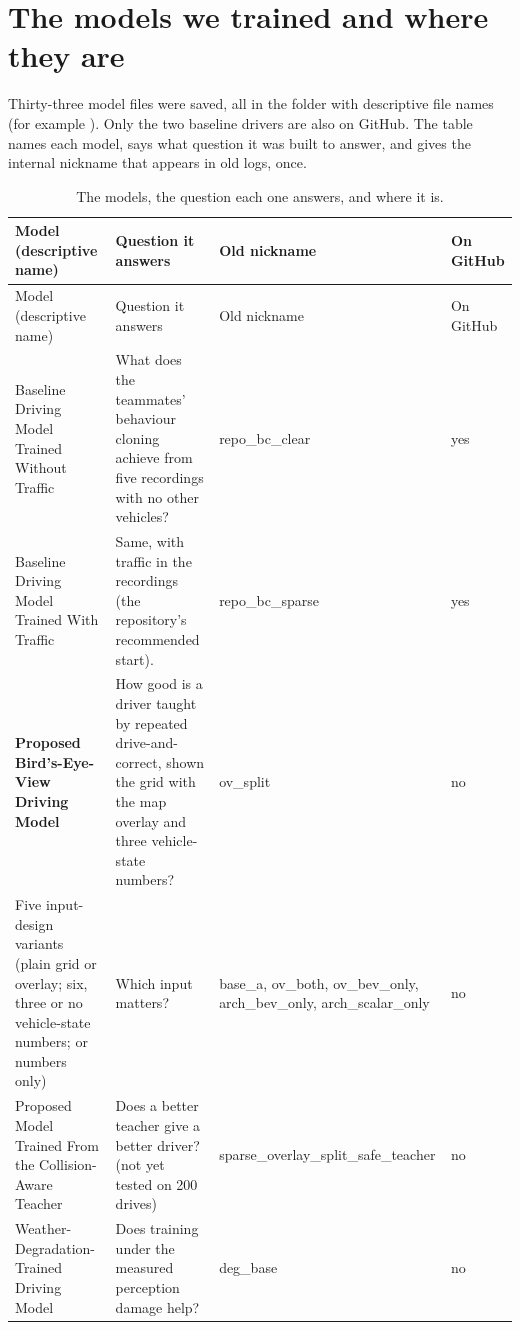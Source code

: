 \section{The models we trained and where they are}\label{sec:g-models}

\begin{plainwords}
Thirty-three model files were saved, all in the folder  with descriptive file names (for example ). Only the two baseline drivers are also on GitHub. The table names each model, says what question it was built to answer, and gives the internal nickname that appears in old logs, once.
\end{plainwords}

{\small
\begin{longtable}{@{}>{\raggedright\arraybackslash}p{4.6cm}>{\raggedright\arraybackslash}p{6.6cm}>{\raggedright\arraybackslash}p{2.2cm}>{\raggedright\arraybackslash}p{1.6cm}@{}}
\caption{The models, the question each one answers, and where it is.}\label{tab:g-models}\\
\toprule Model (descriptive name) & Question it answers & Old nickname & On GitHub\\\midrule\endfirsthead
\toprule Model (descriptive name) & Question it answers & Old nickname & On GitHub\\\midrule\endhead
\bottomrule\endlastfoot
Baseline Driving Model Trained Without Traffic & What does the teammates' behaviour cloning achieve from five recordings with no other vehicles? & repo\_bc\_clear & yes\\
Baseline Driving Model Trained With Traffic & Same, with traffic in the recordings (the repository's recommended start). & repo\_bc\_sparse & yes\\
\textbf{Proposed Bird's-Eye-View Driving Model} & How good is a driver taught by repeated drive-and-correct, shown the grid with the map overlay and three vehicle-state numbers? & ov\_split & no\\
Five input-design variants (plain grid or overlay; six, three or no vehicle-state numbers; or numbers only) & Which input matters? & base\_a, ov\_both, ov\_bev\_only, arch\_bev\_only, arch\_scalar\_only & no\\
Proposed Model Trained From the Collision-Aware Teacher & Does a better teacher give a better driver? (not yet tested on 200 drives) & sparse\_overlay\_split\_safe\_teacher & no\\
Weather-Degradation-Trained Driving Model & Does training under the measured perception damage help? & deg\_base & no\\

\end{longtable}}
